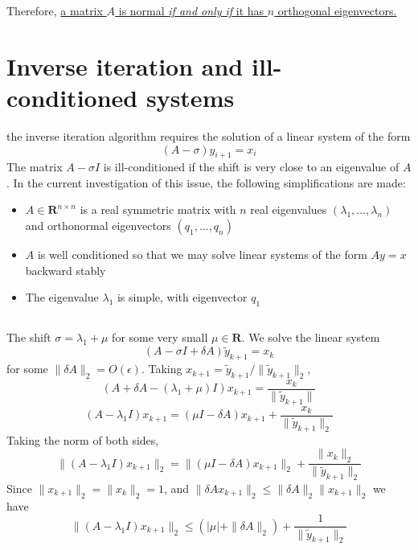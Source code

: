 \documentclass[11pt]{article} %
\begin{document}
Therefore, \uline{a matrix $A$ is normal \emph{if and only if} it has $n$ orthogonal eigenvectors.}


\section{Inverse iteration and ill-conditioned systems}
the inverse iteration algorithm requires the solution of a linear system of the form
\begin{equation}
(A-\sigma)y_{i+1}=x_i
\end{equation}
The matrix $A-\sigma I$ is ill-conditioned if the shift is very close to an eigenvalue of $A$. In the current investigation of this issue, the following simplifications are made:
\begin{itemize}
\item $A \in \mathbf{R}^{n \times n}$ is a real symmetric matrix with $n$ real eigenvalues $(\lambda_1, ..., \lambda_n)$ and orthonormal eigenvectors $(q_1, ... ,q_n)$
\item $A$ is well conditioned so that we may solve linear systems of the form $Ay=x$ backward stably
\item The eigenvalue $\lambda_1$ is simple, with eigenvector $q_1$
\end{itemize}

\subsection{} %
The shift $\sigma = \lambda_1 +\mu$ for some very small $\mu \in \mathbf{R}$. We solve the linear system
\begin{equation}
(A-\sigma I + \delta A)\tilde{y}_{k+1}=x_k
\label{eq:2a}
\end{equation}
for some $\| \delta A \|_2 = O(\epsilon)$. Taking $x_{k+1} =  \tilde{y}_{k+1}/ \| \tilde{y}_{k+1}\|_2$,
\begin{equation}
(A + \delta A - (\lambda_1 + \mu)I )x_{k+1} =\frac{x_k}{\| \tilde{y}_{k+1}\| }
\end{equation}
\begin{equation}
(A - \lambda_1 I )x_{k+1} =(\mu I -\delta A)x_{k+1}  + \frac{x_k}{\| \tilde{y}_{k+1}\|_2 }
\end{equation}
Taking the norm of both sides,
\begin{equation}
\|(A - \lambda_1 I )x_{k+1}\|_2 = \|(\mu I -\delta A)x_{k+1}\|_2  + \frac{\|x_k\|_2}{\| \tilde{y}_{k+1}\|_2 }
\end{equation}
Since $\|x_{k+1} \|_2 = \|x_{k} \|_2 = 1$, and $\|\delta Ax_{k+1} \|_2 \le \|\delta A\|_2 \|x_{k+1}\|_2$ we have
\begin{equation}
\boxed{\|(A - \lambda_1 I )x_{k+1}\|_2 \le (|\mu|  + \|\delta A\|_2) + \frac{1}{\| \tilde{y}_{k+1}\|_2 }}
\end{equation}
\end{document}
